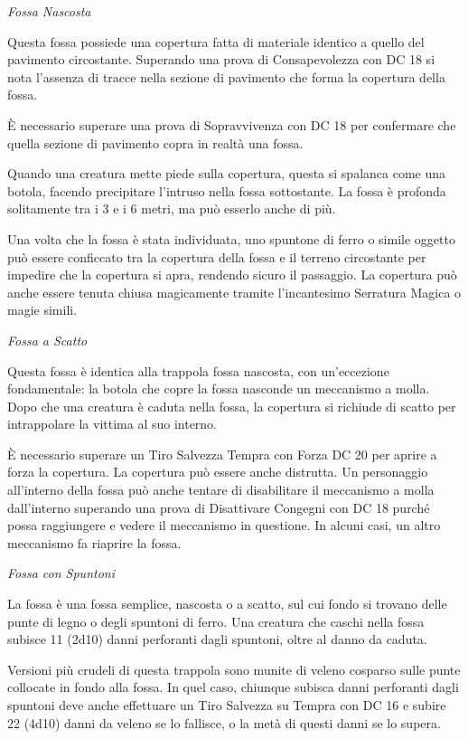 \begin{multicols}{2}
\medskip

\emph{Fossa Nascosta}

Questa fossa possiede una copertura fatta di materiale identico a quello del pavimento circostante.
Superando una prova di Consapevolezza con DC 18 si nota l'assenza di tracce nella sezione di pavimento che forma la copertura della fossa.

È necessario superare una prova di Sopravvivenza con DC 18 per confermare che quella sezione di pavimento copra in realtà una fossa.

Quando una creatura mette piede sulla copertura, questa si spalanca come una botola, facendo precipitare l'intruso nella fossa sottostante. La fossa è profonda solitamente tra i 3 e i 6 metri, ma può esserlo anche di più.

Una volta che la fossa è stata individuata, uno spuntone di ferro o simile oggetto può essere conficcato tra la copertura della fossa e il terreno circostante per impedire che la copertura si apra, rendendo sicuro il passaggio. La copertura può anche essere tenuta chiusa magicamente tramite l'incantesimo Serratura Magica o magie simili.

\medskip
\emph{Fossa a Scatto}

Questa fossa è identica alla trappola fossa nascosta, con un'eccezione fondamentale: la botola che copre la fossa nasconde un meccanismo a molla. Dopo che una creatura è caduta nella fossa, la copertura si richiude di scatto per intrappolare la vittima al suo interno.

È necessario superare un Tiro Salvezza Tempra con Forza DC 20 per aprire a forza la copertura. La copertura può essere anche distrutta. Un personaggio all'interno della fossa può anche tentare di disabilitare il meccanismo a molla dall'interno superando una prova di Disattivare Congegni con DC 18 purché possa raggiungere e vedere il meccanismo in questione. In alcuni casi, un altro meccanismo fa riaprire la fossa.

\medskip

\emph{Fossa con Spuntoni}

La fossa è una fossa semplice, nascosta o a scatto, sul cui fondo si trovano delle punte di legno o degli spuntoni di ferro. Una creatura che caschi nella fossa subisce 11 (2d10) danni perforanti dagli spuntoni, oltre al danno da caduta.

Versioni più crudeli di questa trappola sono munite di veleno cosparso sulle punte collocate in fondo alla fossa. In quel caso, chiunque subisca danni perforanti dagli spuntoni deve anche effettuare un Tiro Salvezza su Tempra con DC 16 e subire 22 (4d10) danni da veleno se lo fallisce, o la metà di questi danni se lo supera.



\end{multicols}
